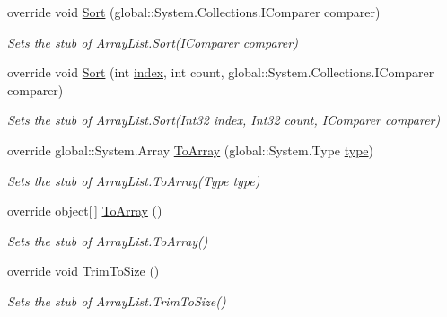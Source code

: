 \begin{DoxyCompactItemize}
override void \hyperlink{class_system_1_1_collections_1_1_fakes_1_1_stub_array_list_ac9f2435f86531e9627a2a82a1c3b6399}{Sort} (global\-::\-System.\-Collections.\-I\-Comparer comparer)
\begin{DoxyCompactList}\small\item\em Sets the stub of Array\-List.\-Sort(\-I\-Comparer comparer)\end{DoxyCompactList}\item 
override void \hyperlink{class_system_1_1_collections_1_1_fakes_1_1_stub_array_list_a242982978aeec90b5600b19c675af092}{Sort} (int \hyperlink{jquery-1_810_82-vsdoc_8js_a75bb12d1f23302a9eea93a6d89d0193e}{index}, int count, global\-::\-System.\-Collections.\-I\-Comparer comparer)
\begin{DoxyCompactList}\small\item\em Sets the stub of Array\-List.\-Sort(\-Int32 index, Int32 count, I\-Comparer comparer)\end{DoxyCompactList}\item 
override global\-::\-System.\-Array \hyperlink{class_system_1_1_collections_1_1_fakes_1_1_stub_array_list_a29e5113a2deb0e350840a977c6830078}{To\-Array} (global\-::\-System.\-Type \hyperlink{jquery-1_810_82-vsdoc_8js_a3940565e83a9bfd10d95ffd27536da91}{type})
\begin{DoxyCompactList}\small\item\em Sets the stub of Array\-List.\-To\-Array(\-Type type)\end{DoxyCompactList}\item 
override object\mbox{[}$\,$\mbox{]} \hyperlink{class_system_1_1_collections_1_1_fakes_1_1_stub_array_list_a7eefb79114e85f1335072679339054a9}{To\-Array} ()
\begin{DoxyCompactList}\small\item\em Sets the stub of Array\-List.\-To\-Array()\end{DoxyCompactList}\item 
override void \hyperlink{class_system_1_1_collections_1_1_fakes_1_1_stub_array_list_a21c762035ef41f1831b6c11a7546628c}{Trim\-To\-Size} ()
\begin{DoxyCompactList}\small\item\em Sets the stub of Array\-List.\-Trim\-To\-Size()\end{DoxyCompactList}\end{DoxyCompactItemize}
